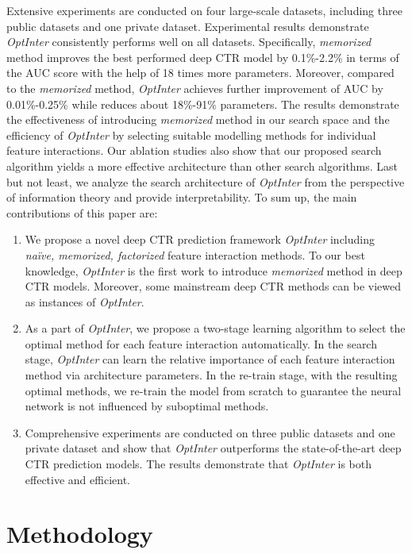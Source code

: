 \documentclass[conference]{IEEEtran}
\begin{document}
Extensive experiments are conducted on four large-scale datasets, including three public datasets and one private dataset. Experimental results demonstrate \textit{OptInter} consistently performs well on all datasets. Specifically, \emph{memorized} method improves the best performed deep CTR model by 0.1\%-2.2\% in terms of the AUC score with the help of 18 times more parameters. Moreover, compared to the \emph{memorized} method, \textit{OptInter} achieves further improvement of AUC by 0.01\%-0.25\%  while reduces about 18\%-91\% parameters. The results demonstrate the effectiveness of introducing \emph{memorized} method in our search space and the efficiency of \textit{OptInter} by selecting suitable modelling methods for individual feature interactions. Our ablation studies also show that our proposed search algorithm yields a more effective architecture than other search algorithms. Last but not least, we analyze the search architecture of \textit{OptInter} from the perspective of information theory and provide interpretability. To sum up, the main contributions of this paper are:
\begin{enumerate}
    \item We propose a novel deep CTR prediction framework \textit{OptInter} including \emph{naïve, memorized, factorized} feature interaction methods. To our best knowledge, \textit{OptInter} is the first work to introduce \emph{memorized} method in deep CTR models. Moreover, some mainstream deep CTR methods can be viewed as instances of \textit{OptInter}.
    \item As a part of \textit{OptInter}, we propose a two-stage learning algorithm to select the optimal method for each feature interaction automatically. In the search stage, \textit{OptInter} can learn the relative importance of each feature interaction method via architecture parameters. In the re-train stage, with the resulting optimal methods, we re-train the model from scratch to guarantee the neural network is not influenced by suboptimal methods.
    \item Comprehensive experiments are conducted on three public datasets and one private dataset and show that \textit{OptInter} outperforms the state-of-the-art deep CTR prediction models. The results demonstrate that \textit{OptInter} is both effective and efficient. 
\end{enumerate}
 \section{Methodology}
\end{document}
